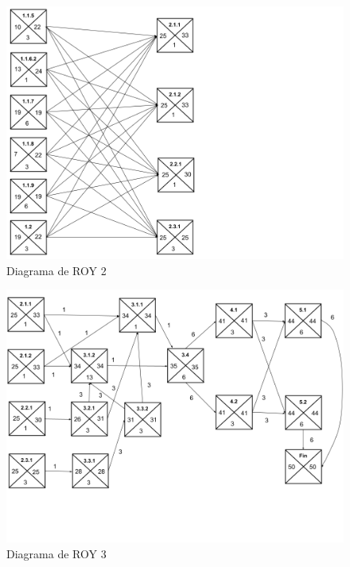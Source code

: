 \documentclass{report}
\begin{document}
            \begin{figure}[H]
                \centering
                \includegraphics[width=1\textwidth]{./img/roy2.png}
                \caption{Diagrama de ROY 2}
            \end{figure}
            \begin{figure}[H]
                \centering
                \includegraphics[width=1\textwidth]{./img/roy3.png}
                \caption{Diagrama de ROY 3}
            \end{figure}
\end{document}
